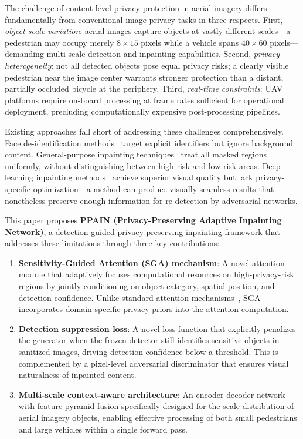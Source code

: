 \documentclass[preprint,12pt]{elsarticle}
\begin{document}
The challenge of content-level privacy protection in aerial imagery differs fundamentally from conventional image privacy tasks in three respects. First, \emph{object scale variation}: aerial images capture objects at vastly different scales---a pedestrian may occupy merely $8 \times 15$ pixels while a vehicle spans $40 \times 60$ pixels---demanding multi-scale detection and inpainting capabilities. Second, \emph{privacy heterogeneity}: not all detected objects pose equal privacy risks; a clearly visible pedestrian near the image center warrants stronger protection than a distant, partially occluded bicycle at the periphery. Third, \emph{real-time constraints}: UAV platforms require on-board processing at frame rates sufficient for operational deployment, precluding computationally expensive post-processing pipelines.

Existing approaches fall short of addressing these challenges comprehensively. Face de-identification methods~\cite{du2014face,li2019face} target explicit identifiers but ignore background content. General-purpose inpainting techniques~\cite{criminisi2004region,telea2004imageinpainting,suvorov2022lama} treat all masked regions uniformly, without distinguishing between high-risk and low-risk areas. Deep learning inpainting methods~\cite{yu2018free,li2022mat} achieve superior visual quality but lack privacy-specific optimization---a method can produce visually seamless results that nonetheless preserve enough information for re-detection by adversarial networks.

This paper proposes \textbf{PPAIN (Privacy-Preserving Adaptive Inpainting Network)}, a detection-guided privacy-preserving inpainting framework that addresses these limitations through three key contributions:

\begin{enumerate}
    \item \textbf{Sensitivity-Guided Attention (SGA) mechanism}: A novel attention module that adaptively focuses computational resources on high-privacy-risk regions by jointly conditioning on object category, spatial position, and detection confidence. Unlike standard attention mechanisms~\cite{woo2018cbam,hu2018squeeze}, SGA incorporates domain-specific privacy priors into the attention computation.

    \item \textbf{Detection suppression loss}: A novel loss function that explicitly penalizes the generator when the frozen detector still identifies sensitive objects in sanitized images, driving detection confidence below a threshold. This is complemented by a pixel-level adversarial discriminator that ensures visual naturalness of inpainted content.

    \item \textbf{Multi-scale context-aware architecture}: An encoder-decoder network with feature pyramid fusion specifically designed for the scale distribution of aerial imagery objects, enabling effective processing of both small pedestrians and large vehicles within a single forward pass.
\end{enumerate}
\end{document}
